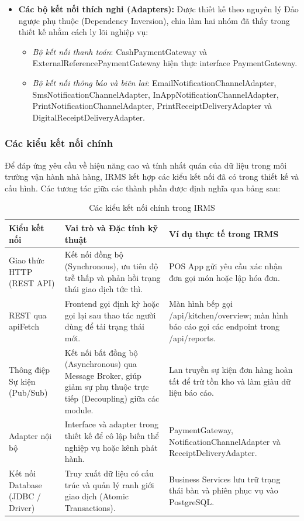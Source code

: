 \begin{itemize}
  \item \textbf{Các bộ kết nối thích nghi (Adapters):} Được thiết kế theo nguyên lý Đảo ngược phụ thuộc (Dependency Inversion), chia làm hai nhóm đã thấy trong thiết kế nhằm cách ly lõi nghiệp vụ:
  \begin{itemize}
      \item \textit{Bộ kết nối thanh toán}: \textsf{CashPaymentGateway} và \textsf{ExternalReferencePaymentGateway} hiện thực interface \textsf{PaymentGateway}.
      \item \textit{Bộ kết nối thông báo và biên lai}: \textsf{EmailNotificationChannelAdapter}, \textsf{SmsNotificationChannelAdapter}, \textsf{InAppNotificationChannelAdapter}, \textsf{PrintNotificationChannelAdapter}, \textsf{PrintReceiptDeliveryAdapter} và \textsf{DigitalReceiptDeliveryAdapter}.
  \end{itemize}
\end{itemize}

\subsubsection{Các kiểu kết nối chính}\label{sec:main-connectors}
Để đáp ứng yêu cầu về hiệu năng cao và tính nhất quán của dữ liệu trong môi trường vận hành nhà hàng, IRMS kết hợp các kiểu kết nối đã có trong thiết kế và cấu hình. Các tương tác giữa các thành phần được định nghĩa qua bảng sau:

\begin{table}[H]
\centering
\caption{Các kiểu kết nối chính trong IRMS}
\begin{tabularx}{\textwidth}{|p{2.95cm}|X|p{4cm}|}
\hline
\textbf{Kiểu kết nối} & \textbf{Vai trò và Đặc tính kỹ thuật} & \textbf{Ví dụ thực tế trong IRMS} \\
\hline
Giao thức HTTP (REST API) & Kết nối đồng bộ (Synchronous), ưu tiên độ trễ thấp và phản hồi trạng thái giao dịch tức thì. & POS App gửi yêu cầu xác nhận đơn gọi món hoặc lập hóa đơn. \\
\hline
REST qua \textsf{apiFetch} & Frontend gọi định kỳ hoặc gọi lại sau thao tác người dùng để tải trạng thái mới. & Màn hình bếp gọi \textsf{/api/kitchen/overview}; màn hình báo cáo gọi các endpoint trong \textsf{/api/reports}. \\
\hline
Thông điệp Sự kiện (Pub/Sub) & Kết nối bất đồng bộ (Asynchronous) qua Message Broker, giúp giảm sự phụ thuộc trực tiếp (Decoupling) giữa các module. & Lan truyền sự kiện đơn hàng hoàn tất để trừ tồn kho và làm giàu dữ liệu báo cáo. \\
\hline  
Adapter nội bộ & Interface và adapter trong thiết kế để cô lập biến thể nghiệp vụ hoặc kênh phát hành. & \textsf{PaymentGateway}, \textsf{NotificationChannelAdapter} và \textsf{ReceiptDeliveryAdapter}. \\
\hline
Kết nối Database (JDBC / Driver) & Truy xuất dữ liệu có cấu trúc và quản lý ranh giới giao dịch (Atomic Transactions). & Business Services lưu trữ trạng thái bàn và phiên phục vụ vào PostgreSQL. \\
\hline
\end{tabularx}
\end{table}

